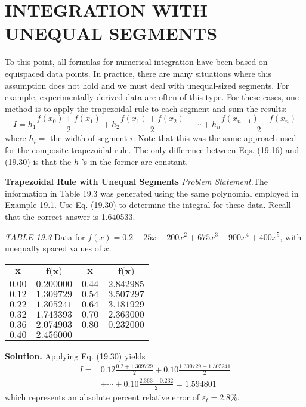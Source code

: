 \documentclass[../main.tex]{subfiles}
\begin{document}
\section{INTEGRATION WITH UNEQUAL SEGMENTS}
To this point, all formulas for numerical integration have been based on equispaced data
points. In practice, there are many situations where this assumption does not hold and we
must deal with unequal-sized segments. For example, experimentally derived data are
often of this type. For these cases, one method is to apply the trapezoidal rule to each segment and sum the results:
\begin{equation}
    \tag{19.30}
I=h_{1} \frac{f\left(x_{0}\right)+f\left(x_{1}\right)}{2}+h_{2} \frac{f\left(x_{1}\right)+f\left(x_{2}\right)}{2}+\cdots+h_{n} \frac{f\left(x_{n-1}\right)+f\left(x_{n}\right)}{2}
\end{equation}
where $h_{i}=$ the width of segment $i$. Note that this was the same approach used for the composite trapezoidal rule. The only difference between Eqs. (19.16) and (19.30) is that the $h$ 's in the former are constant.

\begin{exmp} \textbf{Trapezoidal Rule with Unequal Segments}
    \noindent\textit{Problem Statement.}The information in Table 19.3 was generated using the same polynomial employed in Example 19.1. Use Eq. (19.30) to determine the integral for these data.
	Recall that the correct answer is 1.640533.	

	\textit{TABLE 19.3} Data for $f(x)=0.2+25 x-200 x^{2}+675 x^{3}-900 x^{4}+400 x^{5}$, with unequally spaced values of $x$.\\
	\begin{center}
\begin{tabular}{cccc}
\hline $\boldsymbol{x}$ & $\boldsymbol{f}(\boldsymbol{x} \boldsymbol{)}$ & $\boldsymbol{x}$ & $\boldsymbol{f}(\boldsymbol{x} \boldsymbol{)}$ \\
\hline $0.00$ & $0.200000$ & $0.44$ & $2.842985$ \\
$0.12$ & $1.309729$ & $0.54$ & $3.507297$ \\
$0.22$ & $1.305241$ & $0.64$ & $3.181929$ \\
$0.32$ & $1.743393$ & $0.70$ & $2.363000$ \\
$0.36$ & $2.074903$ & $0.80$ & $0.232000$ \\
$0.40$ & $2.456000$ & & \\
\hline
\end{tabular}
\end{center}
    \noindent \textbf{Solution.} Applying Eq. (19.30) yields
	$$
	\begin{aligned}
	I=& 0.12 \frac{0.2+1.309729}{2}+0.10 \frac{1.309729+1.305241}{2} \\
	&+\cdots+0.10 \frac{2.363+0.232}{2}=1.594801
	\end{aligned}
	$$
	which represents an absolute percent relative error of $\varepsilon_{t}=2.8 \%$.
\end{exmp}
\end{document}
